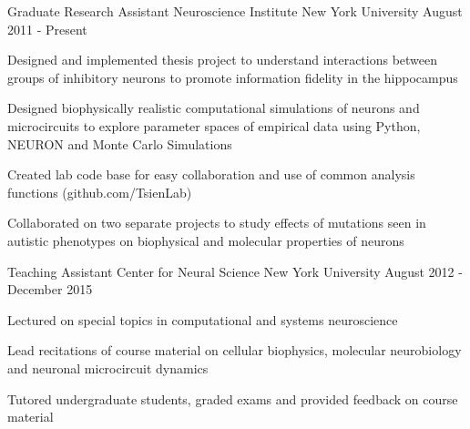 



\begin{cventries}



\cventry
{Graduate Research Assistant} %
{Neuroscience Institute} %
{New York University} %
{August 2011 - Present} %
{ %
\begin{cvitems}
\item {Designed and implemented thesis project to understand interactions between groups of inhibitory neurons to promote information fidelity in the hippocampus}
\item {Designed biophysically realistic computational simulations of neurons and microcircuits to explore parameter spaces of empirical data using Python, NEURON and Monte Carlo Simulations}
\item {Created lab code base for easy collaboration and use of common analysis functions (github.com/TsienLab)}
\item {Collaborated on two separate projects to study effects of mutations seen in autistic phenotypes on biophysical and molecular properties of neurons}
\end{cvitems}
}
\cventry
{Teaching Assistant} %
{Center for Neural Science} %
{New York University} %
{August 2012 - December 2015} %
{ %
\begin{cvitems}
\item {Lectured on special topics in computational and systems neuroscience}
\item {Lead recitations of course material on cellular biophysics, molecular neurobiology and neuronal microcircuit dynamics}
\item {Tutored undergraduate students, graded exams and provided feedback on course material}
\end{cvitems}
}

\end{cventries}
